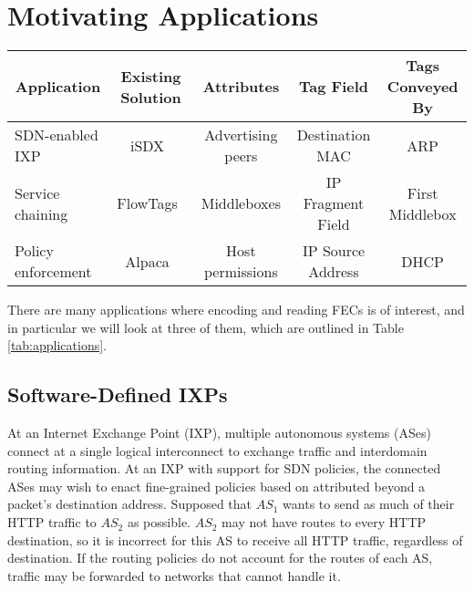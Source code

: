 

\section{Motivating Applications}\label{sec:motivation}
\begin{table*}[t]
\begin{center}
    \begin{tabular}{|l|c|c|c|c|}
    \hline
    \multicolumn{1}{|c|}{\bf Application} & 
    \multicolumn{1}{c|}{\bf Existing Solution} & 
    \multicolumn{1}{c|}{\bf Attributes} & 
    \multicolumn{1}{c|}{\bf Tag Field} & 
    \multicolumn{1}{c|}{\bf Tags Conveyed By}\\ \hline
    SDN-enabled IXP & iSDX~\cite{isdx} & Advertising peers & Destination MAC & ARP \\ \hline
    Service chaining & FlowTags~\cite{flowtags} & Middleboxes & IP Fragment Field & First Middlebox \\ \hline
    Policy enforcement & Alpaca~\cite{alpaca} & Host permissions & IP Source Address & DHCP \\ \hline
    \end{tabular}
\end{center}
    \caption{Example applications and systems which have solved them by some form of tagging.} 
    \label{tab:applications}
\end{table*}

There are many applications where encoding and reading FECs is of interest, and in particular we will look at three of them, which are outlined in Table \ref{tab:applications}.
 
\subsection{Software-Defined IXPs}
At an Internet Exchange Point (IXP), multiple autonomous systems (ASes)
connect at a single logical interconnect to exchange traffic and
interdomain routing information.  At an IXP with support for SDN
policies, the connected ASes may wish to enact fine-grained 
policies based on attributed beyond a packet's destination
address. Supposed that $AS_1$ wants to send as much of their HTTP traffic
to $AS_2$ as possible. $AS_2$ may not have routes to every HTTP
destination, so it is incorrect for this AS to receive all HTTP traffic,
regardless of destination. If
the routing policies do not account for the routes of each AS, traffic
may be forwarded to networks that cannot handle it.

